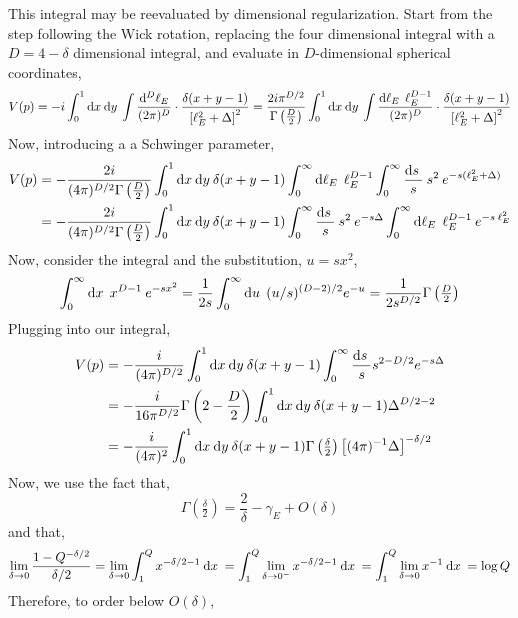 \documentclass{article}
\begin{document}
This integral may be reevaluated by dimensional regularization. Start from the step following the Wick rotation, replacing the four dimensional integral with a $D = 4 - \delta$ dimensional integral, and evaluate in $D$-dimensional spherical coordinates,
\[ V(p) = -i \int_{0}^{1} \mathrm{d}x \: \mathrm{d}y \: \int \frac{\mathrm{d}^{D} \ell_E}{(2\pi)^D} \cdot \frac{\delta(x + y - 1)}{\left[\ell_E^2 + \Delta \right]^2} = \frac{2i \pi^{D/2}}{\Gamma \left(\frac{D}{2}\right)} \int_{0}^{1} \mathrm{d}x \: \mathrm{d}y \: \int \frac{\mathrm{d}\ell_E \: \: \ell_E^{D-1}}{(2\pi)^D} \cdot \frac{\delta(x + y - 1)}{\left[\ell_E^2 + \Delta \right]^2} \]
Now, introducing a a Schwinger parameter,
\begin{align*}
V(p) & = -\frac{2i}{(4 \pi)^{D/2} \Gamma \left(\frac{D}{2}\right)} \int_{0}^{1} \mathrm{d}x \: \mathrm{d}y \: \delta(x + y - 1) \int_0^\infty \mathrm{d}\ell_E \: \: \ell_E^{D-1} \int_0^\infty \frac{\mathrm{d}s \:}{s} \: s^2 \: e^{-s (\ell_E^2 + \Delta)} 
\\
& = -\frac{2i}{(4 \pi)^{D/2} \Gamma \left(\frac{D}{2}\right)} \int_{0}^{1} \mathrm{d}x \: \mathrm{d}y \: \delta(x + y - 1) \int_0^\infty \frac{\mathrm{d}s \:}{s} \: s^2 \: e^{- s \Delta} \int_0^\infty \mathrm{d}\ell_E \: \: \ell_E^{D-1}  \: e^{-s \: \ell_E^2} 
\end{align*}
Now, consider the integral and the substitution, $u = s x^2$, 
\begin{align*}
\int_0^\infty \mathrm{d}x \: \: x^{D-1} \: e^{-s x^2} = \frac{1}{2s} \int_{0}^\infty \mathrm{d}u \: \: (u/s)^{(D-2)/2} e^{-u} = \frac{1}{2 s^{D/2}} \Gamma\left(\tfrac{D}{2}\right)  
\end{align*}
Plugging into our integral,
\begin{align*}
V(p) & = - \frac{i}{(4 \pi)^{D/2}} \int_{0}^{1} \mathrm{d}x \: \mathrm{d}y \: \delta(x + y - 1) \int_0^\infty \frac{\mathrm{d}s \:}{s} s^{2 - D/2} e^{-s \Delta}
\\
& = -\frac{i}{16 \pi^{D/2}} \Gamma\left(2 - \frac{D}{2} \right) \int_{0}^{1} \mathrm{d}x \: \mathrm{d}y \: \delta(x + y - 1) \Delta^{D/2 - 2} 
\\
& = - \frac{i}{(4 \pi)^2} \int_{0}^{1} \mathrm{d}x \: \mathrm{d}y \: \delta(x + y - 1) \Gamma\left(\tfrac{\delta}{2}\right) \left[(4 \pi)^{-1} \Delta \right]^{- \delta / 2}
\end{align*}
Now, we use the fact that,
\[ \Gamma\left(\tfrac{\delta}{2}\right) = \frac{2}{\delta} - \gamma_E + O(\delta) \]
and that,
\[ \lim\limits_{\delta \to 0} \frac{1 - Q^{-\delta/2}}{\delta/2} =  \lim\limits_{\delta \to 0} \int_1^Q x^{-\delta/2 - 1} \: \mathrm{d}x \: = \int_1^Q \lim\limits_{\delta \to 0^-} x^{-\delta/2 - 1} \: \mathrm{d}x \:  = \int_1^Q \lim\limits_{\delta \to 0} x^{- 1} \: \mathrm{d}x \: = \log{Q} \]
Therefore, to order below $O(\delta)$,
\end{document}
